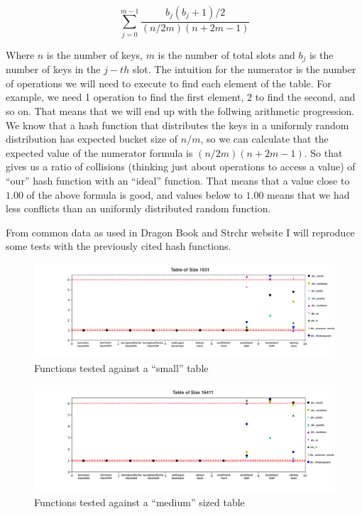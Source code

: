 \[ \sum_{j = 0}^{m - 1} \frac{b_j(b_j + 1)/2}{ (n/2m)(n + 2m - 1) } \]

Where \( n \) is the number of keys, \( m \) is the number of total slots and \( b_j \) is the number of keys in the \( j-th \) slot. The intuition for the numerator is the number of operations we will need to execute to find each element of the table. For example, we need 1 operation to find the first element, 2 to find the second, and so on. That means that we will end up with the follwing arithmetic progression. We know that a hash function that distributes the keys in a uniformly random distribution has expected bucket size of \( n / m \), so we can calculate that the expected value of the numerator formula is \( (n/2m)(n + 2m - 1) \). So that gives us a ratio of collisions (thinking just about operations to access a value) of ``our'' hash function with an ``ideal'' function. That means that a value close to \( 1.00 \) of the above formula is good, and values below to \( 1.00 \) means that we had less conflicts than an uniformly distributed random function.

From common data as used in Dragon Book and Strchr website \cite{DragonHashFunc} I will reproduce some tests with the previously cited hash functions.

\begin{figure}[h!]
  \raggedleft
  \includegraphics[width=18cm]{figuras/1031HashFunc.png}
  \caption{Functions tested against a ``small'' table}
\end{figure}

\medskip

\begin{figure}[h!]
  \raggedleft
  \includegraphics[width=18cm]{figuras/16411HashFunc.png}
  \caption{Functions tested against a ``medium'' sized table}
\end{figure}

